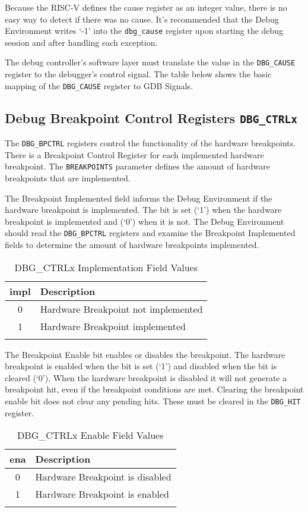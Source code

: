Because the RISC-V defines the cause register as an integer value, there
is no easy way to detect if there was no cause. It's recommended that
the Debug Environment writes `-1' into the \texttt{dbg\_cause} register upon
starting the debug session and after handling each exception.

The debug controller's software layer must translate the value in the
\texttt{DBG\_CAUSE} register to the debugger's control signal. The table below
shows the basic mapping of the \texttt{DBG\_CAUSE} register to GDB Signals.

\subsection{Debug Breakpoint Control Registers
\texttt{DBG\_CTRLx}}\label{debug-breakpoint-control-registers-dbg_ctrlx}



The \texttt{DBG\_BPCTRL} registers control the functionality of the hardware
breakpoints. There is a Breakpoint Control Register for each implemented
hardware breakpoint. The \texttt{BREAKPOINTS} parameter defines the amount of
hardware breakpoints that are implemented.

The Breakpoint Implemented field informs the Debug Environment if the
hardware breakpoint is implemented. The bit is set (`1') when the
hardware breakpoint is implemented and (`0') when it is not. The Debug
Environment should read the \texttt{DBG\_BPCTRL} registers and examine the
Breakpoint Implemented fields to determine the amount of hardware
breakpoints implemented.

\begin{longtable}[]{@{}cl@{}}
\toprule
impl & Description\tabularnewline
\midrule
\endhead
0 & Hardware Breakpoint not implemented\tabularnewline
1 & Hardware Breakpoint implemented\tabularnewline
\bottomrule
\caption{DBG\_CTRLx Implementation Field Values}
\end{longtable}


The Breakpoint Enable bit enables or disables the breakpoint. The
hardware breakpoint is enabled when the bit is set (`1') and disabled
when the bit is cleared (`0'). When the hardware breakpoint is disabled
it will not generate a breakpoint hit, even if the breakpoint conditions
are met. Clearing the breakpoint enable bit does not clear any pending
hits. These must be cleared in the \texttt{DBG\_HIT} register.

\begin{longtable}[]{@{}cl@{}}
\toprule
ena & Description\tabularnewline
\midrule
\endhead
0 & Hardware Breakpoint is disabled\tabularnewline
1 & Hardware Breakpoint is enabled\tabularnewline
\bottomrule
\caption{DBG\_CTRLx Enable Field Values}
\end{longtable}



